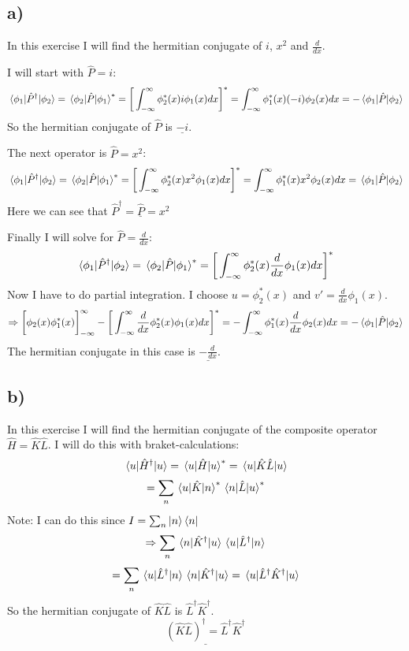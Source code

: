 \documentclass{scrartcl}
\begin{document}
\subsection*{a)}
In this exercise I will find the hermitian conjugate of $i$, $x^2$ and $\frac{d}{dx}$.\par\vspace{3mm}
I will start with $\hat{P}=i$:
$$\mel*{\phi_1}{\hat{P}^\dagger}{\phi_2}=\mel*{\phi_2}{\hat{P}}{\phi_1}^*=\bigg[\int_{-\infty}^{\infty} \phi_2^*(x)i\phi_1(x)dx\bigg]^*=\int_{-\infty}^{\infty} \phi_1^*(x)(-i)\phi_2(x)dx=-\mel*{\phi_1}{\hat{P}}{\phi_2}$$
So the hermitian conjugate of $\hat{P}$ is $\underline{-i}$.\par\vspace{6mm}
The next operator is $\hat{P}=x^2$:
$$\mel*{\phi_1}{\hat{P}^\dagger}{\phi_2}=\mel*{\phi_2}{\hat{P}}{\phi_1}^*=\bigg[\int_{-\infty}^{\infty} \phi_2^*(x)x^2\phi_1(x)dx\bigg]^*=\int_{-\infty}^{\infty} \phi_1^*(x)x^2\phi_2(x)dx=\mel*{\phi_1}{\hat{P}}{\phi_2}$$
Here we can see that $\underline{\hat{P}^\dagger=\hat{P}=x^2}$ \par\vspace{6mm}
Finally I will solve for $\hat{P}=\frac{d}{dx}:$
$$\mel*{\phi_1}{\hat{P}^\dagger}{\phi_2}=\mel*{\phi_2}{\hat{P}}{\phi_1}^*=\bigg[\int_{-\infty}^{\infty} \phi_2^*(x)\frac{d}{dx}\phi_1(x)dx\bigg]^*$$
Now I have to do partial integration. I choose $u=\phi_2^*(x)$ and $v'=\frac{d}{dx}\phi_1(x)$.
$$\Rightarrow\bigg[\phi_2(x)\phi_1^*(x)\bigg]_{-\infty}^{\infty}-\bigg[\int_{-\infty}^{\infty} \frac{d}{dx}\phi_2^*(x)\phi_1(x)dx\bigg]^*=-\int_{-\infty}^{\infty} \phi_1^*(x)\frac{d}{dx}\phi_2(x)dx=-\mel*{\phi_1}{\hat{P}}{\phi_2}$$
The hermitian conjugate in this case is $\underline{-\frac{d}{dx}}$.


\subsection*{b)}
In this exercise I will find the hermitian conjugate of the composite operator $\hat{H}=\hat{K}\hat{L}$. I will do this with braket-calculations:
$$\mel*{u}{\hat{H}^\dagger}{u}=\mel*{u}{\hat{H}}{u}^*=\mel*{u}{\hat{K}\hat{L}}{u}$$
$$=\sum_{n} \mel*{u}{\hat{K}}{n}^* \mel*{n}{\hat{L}}{u}^*$$
Note: I can do this since $I=\sum_{n}\ket{n}\bra{n}$
$$\Rightarrow \sum_{n} \mel*{n}{\hat{K}^\dagger}{u} \mel*{u}{\hat{L}^\dagger}{n}$$
$$=\sum_{n} \mel*{u}{\hat{L}^\dagger}{n} \mel*{n}{\hat{K}^\dagger}{u}=\mel*{u}{\hat{L}^\dagger\hat{K}^\dagger}{u}$$
So the hermitian conjugate of $\hat{K}\hat{L}$ is $\hat{L}^\dagger\hat{K}^\dagger$.
$$\underline{(\hat{K}\hat{L})^\dagger=\hat{L}^\dagger\hat{K}^\dagger}$$
\end{document}
